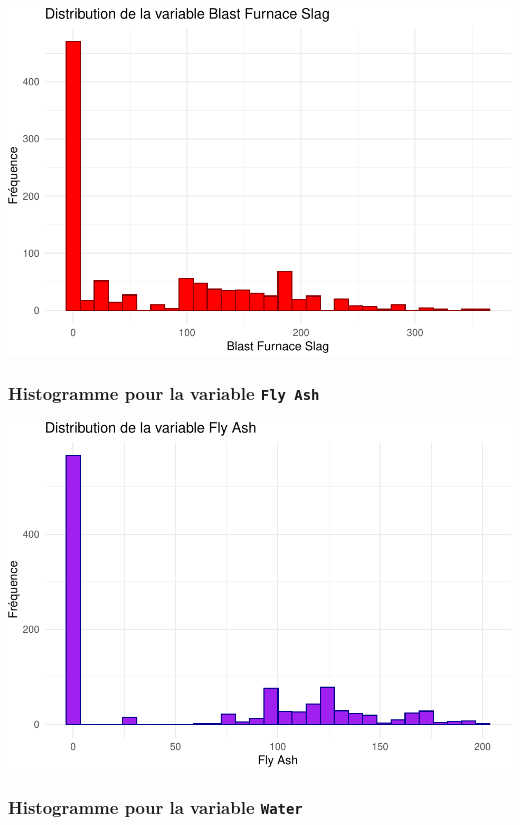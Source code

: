 \documentclass[
  12pt,
]{article}
\begin{document}
\includegraphics{rmd_final_files/figure-latex/unnamed-chunk-41-1.pdf}

\subsubsection{\texorpdfstring{Histogramme pour la variable
\texttt{Fly\ Ash}}{Histogramme pour la variable Fly Ash}}\label{histogramme-pour-la-variable-fly-ash}

\includegraphics{rmd_final_files/figure-latex/unnamed-chunk-42-1.pdf}

\subsubsection{\texorpdfstring{Histogramme pour la variable
\texttt{Water}}{Histogramme pour la variable Water}}\label{histogramme-pour-la-variable-water}
\end{document}

